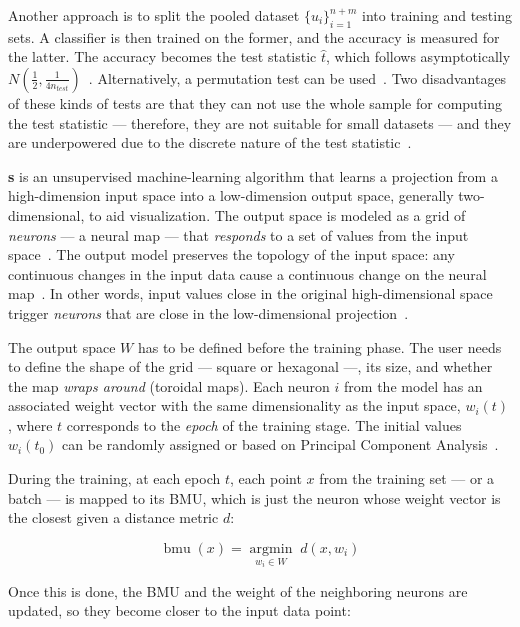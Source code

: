 Another approach is to split the pooled dataset $\{u_i\}_{i=1}^{n+m}$ into training
and testing sets. A classifier is then trained on the former, and the accuracy is
measured for the latter. The accuracy becomes the test statistic $\hat t$, which
follows asymptotically $N(\frac{1}{2}, \frac{1}{4 n_{test}})$~\cite{lopez2016revisiting}.
Alternatively, a permutation test can be used~\cite{kim2021classification}.
Two disadvantages of these kinds of tests are that they can not use the whole sample
for computing the test statistic --- therefore, they are not suitable for small
datasets --- and they are underpowered due to the discrete nature of the test
statistic~\cite{rosenblatt2019better}.

\textbf{s}
is an unsupervised machine-learning algorithm that learns
a projection from a high-dimension input space into a low-dimension output space,
generally two-dimensional, to aid visualization.
The output space is modeled as a grid of \emph{neurons} --- a neural map ---
that \emph{responds} to a set of values from the input space~\cite{kohonen1982self}.
The output model preserves the topology of the input space: any continuous changes
in the input data cause a continuous change on the neural map~\cite{Villmann1999}.
In other words, input values close in the original high-dimensional space
trigger \emph{neurons} that are close in the low-dimensional projection~\cite{KOHONEN201352}.

The output space $W$ has to be defined before the training phase.
The user needs to define the shape of the grid --- square or hexagonal ---,
its size, and whether the map \emph{wraps around} (toroidal maps).
Each neuron $i$ from the model has an associated weight vector with the same
dimensionality as the input space, $w_{i}(t)$, where $t$ corresponds to the
\emph{epoch} of the training stage.
The initial values $w_i(t_0)$ can be randomly assigned or based on
Principal Component Analysis~\cite{KOHONEN201352}.

During the training, at each epoch $t$, each point $x$ from the training set
--- or a batch --- is mapped to its \gls{BMU}, which is
just the neuron whose weight vector is the closest given a distance metric $d$:

\begin{equation}
    \operatorname{bmu}(x) = \underset{w_i \in W}{\operatorname{argmin}} \; d(x, w_i)
\end{equation}

Once this is done, the \gls{BMU} and the weight of the neighboring neurons are updated, so they become closer to the input data point:

